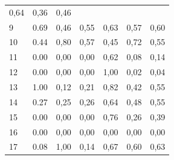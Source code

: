 \begin{table}[ht]
\begin{tabular}{l|c|c|c|c|c|c}
        0,64  & 0,36                                    & 0,46                                                      \\
        9     & 0.69                                    & 0,46                                        & 0,55      &
        0,63  & 0,57                                    & 0,60                                                      \\
        10    & 0.44                                    & 0,80                                        & 0,57      &
        0,45  & 0,72                                    & 0,55                                                      \\
        11    & 0.00                                    & 0,00                                        & 0,00      &
        0,62  & 0,08                                    & 0,14                                                      \\
        12    & 0.00                                    & 0,00                                        & 0,00      &
        1,00  & 0,02                                    & 0,04                                                      \\
        13    & 1.00                                    & 0,12                                        & 0,21      &
        0,82  & 0,42                                    & 0,55                                                      \\
        14    & 0.27                                    & 0,25                                        & 0,26      &
        0,64  & 0,48                                    & 0,55                                                      \\
        15    & 0.00                                    & 0,00                                        & 0,00      &
        0,76  & 0,26                                    & 0,39                                                      \\
        16    & 0.00                                    & 0,00                                        & 0,00      &
        0,00  & 0,00                                    & 0,00                                                      \\
        17    & 0.08                                    & 1,00                                        & 0,14      &
        0,67  & 0,60                                    & 0,63                                                      \\

\end{tabular}
\end{table}
